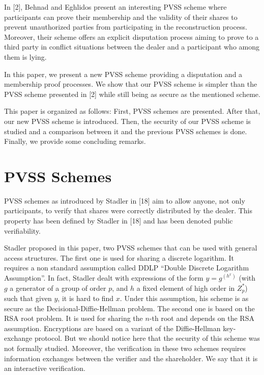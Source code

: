 \documentclass[submission,copyright,creativecommons]{eptcs}
\begin{document}
In [2], Behnad and Eghlidos present an interesting PVSS scheme where
participants can prove their membership and the validity of their shares to
prevent unauthorized parties from participating in the reconstruction
process. Moreover, their scheme offers an explicit disputation process
aiming to prove to a third party in conflict situations between the dealer
and a participant who among them is lying.

In this paper, we present a new PVSS scheme providing a disputation and a
membership proof processes. We show that our PVSS scheme is simpler than the
PVSS scheme presented in [2] while still being as secure as the mentioned
scheme.

This paper is organized as follows: First, PVSS schemes are presented. After
that, our new PVSS scheme is introduced. Then, the security of our PVSS
scheme is studied and a comparison between it and the previous PVSS schemes
is done. Finally, we provide some concluding remarks.

\section{PVSS Schemes}

PVSS schemes as introduced by Stadler in [18] aim to allow anyone, not only
participants, to verify that shares were correctly distributed by the
dealer. This property has been defined by Stadler in [18] and has been
denoted public verifiability.

Stadler proposed in this paper, two PVSS schemes that can be used with
general access structures. The first one is used for sharing a discrete
logarithm. It requires a non standard assumption called DDLP
\textquotedblleft Double Discrete Logarithm Assumption\textquotedblright .
In fact, Stadler dealt with expressions of the form $y=g^{(h^{x})}$ (with $g$
a generator of a group of order $p$, and $h$ a fixed element of high order
in $Z_{p}^{\ast }$) such that given $y$, it is hard to find $x$. Under this
assumption, his scheme is as secure as the Decisional-Diffie-Hellman
problem. The second one is based on the RSA root problem. It is used for
sharing the $n$-th root and depends on the RSA assumption. Encryptions are
based on a variant of the Diffie-Hellman key-exchange protocol. But we
should notice here that the security of this scheme was not formally
studied. Moreover, the verification in these two schemes requires
information exchanges between the verifier and the shareholder. We say that
it is an interactive verification.
\end{document}
